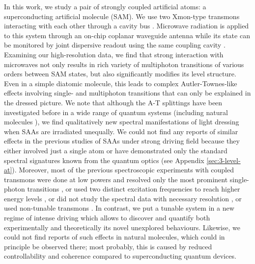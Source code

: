 \documentclass[%
 aps, prx,
 amsmath,amssymb,
 reprint,%
superscriptaddress
]{revtex4-2}
\begin{document}
In this work, we study a pair of strongly coupled 
artificial atoms: a superconducting artificial 
molecule \cite{kou2017fluxonium} (SAM). We use two 
Xmon-type \cite{barends2013coherent} 
transmons \cite{koch2007charge} interacting with 
each other through a cavity 
bus \cite{majer2007coupling}. Microwave radiation 
is applied to this system through an on-chip 
coplanar waveguide antenna while its state can be 
monitored by joint dispersive readout using the 
same coupling cavity \cite{chow2010detecting}. Examining our high-resolution data, we
find that strong interaction with microwaves not 
only results in rich variety of multiphoton transitions of 
various orders between SAM states, but also 
significantly modifies its level structure. Even 
in a simple diatomic molecule, this leads to 
complex Autler-Townes-like effects involving 
single- and multiphoton  transitions that can 
only be explained in the dressed picture. We note 
that although the A-T splittings have been 
investigated before in a wide range of quantum 
systems (including natural 
molecules \cite{tamarat1995pump, 
ahmed2012autler}), we find qualitatively new 
spectral manifestations of light dressing when 
SAAs are irradiated unequally. We could not find any reports of similar effects in the 
previous studies of SAAs under strong driving field because they
either involved just a single atom \cite{baur2009measurement, 
	sillanpaa2009autler, astafiev2010resonance, 
	novikov2013autler, 
	koshino2013observation, 
	braumuller2015multiphoton, peng2018vacuum, 
	gasparinetti2019two} or have 
demonstrated only the standard spectral 
signatures known from the quantum optics \cite{suri2013observation} (see 
Appendix \ref{sec:3-level-at}). Moreover, most of the previous spectroscopic experiments with coupled transmons were done at low powers and resolved only the most prominent single-photon transitions \cite{majer2007coupling, filipp2011multimode}, or used two distinct excitation frequencies to reach higher energy levels \cite{dicarlo2009demonstration}, or did not study the spectral data with necessary resolution \cite{kounalakis2018tuneable}, or used non-tunable transmons \cite{poletto2012entanglement}. In contrast, we put a tunable system in a new regime of intense driving which allows to discover and quantify both experimentally and theoretically its novel unexplored behaviours. Likewise, we could not find reports of such effects in natural molecules, 
which could in principle be observed there; most probably, this is caused by reduced controllability and 
coherence compared to superconducting quantum devices. 
\end{document}
